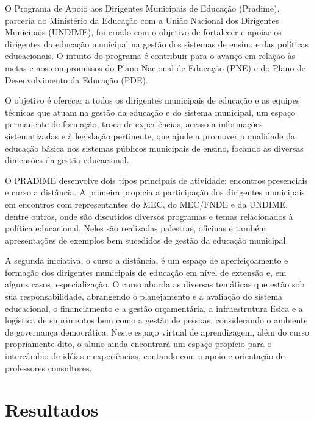 \documentclass[
	12pt,				%
	openright,			%
	oneside,
	a4paper,			%
	chapter=TITLE,		%
	section=TITLE,		%
	sumario=abnt-6027-2012,
	english,			%
	brazil				%
]{abntex2}
\begin{document}
		\begin{citacao}
			O Programa de Apoio aos Dirigentes Municipais de Educação (Pradime), parceria do Ministério da Educação com a União Nacional dos Dirigentes Municipais (UNDIME), foi criado com o objetivo de fortalecer e apoiar os dirigentes da educação municipal na gestão dos sistemas de ensino e das políticas educacionais. O intuito do programa é contribuir para o avanço em relação às metas e aos compromissos do Plano Nacional de Educação (PNE) e do Plano de Desenvolvimento da Educação (PDE).
			
			O objetivo é oferecer a todos os dirigentes municipais de educação e as equipes técnicas que atuam na gestão da educação e do sistema municipal, um espaço permanente de formação, troca de experiências, acesso a informações sistematizadas e à legislação pertinente, que ajude a promover a qualidade da educação básica nos sistemas públicos municipais de ensino, focando as diversas dimensões da gestão educacional.
			
			O PRADIME desenvolve dois tipos principais de atividade: encontros presenciais e curso a distância. A primeira propicia a participação dos dirigentes municipais em encontros com representantes do MEC, do MEC/FNDE e da UNDIME, dentre outros, onde são discutidos diversos programas e temas relacionados à política educacional. Neles são realizadas palestras, oficinas e também apresentações de exemplos bem sucedidos de gestão da educação municipal.
			
			A segunda iniciativa, o curso a distância, é um espaço de aperfeiçoamento e formação dos dirigentes municipais de educação em nível de extensão e, em alguns casos, especialização. O curso aborda as diversas temáticas que estão sob sua responsabilidade, abrangendo o planejamento e a avaliação do sistema educacional, o financiamento e a gestão orçamentária, a infraestrutura física e a logística de suprimentos bem como a gestão de pessoas, considerando o ambiente de governança democrática. Neste espaço virtual de aprendizagem, além do curso propriamente dito, o aluno ainda encontrará um espaço propício para o intercâmbio de idéias e experiências, contando com o apoio e orientação de professores consultores.
		\end{citacao}


\chapter{Resultados}
\end{document}
